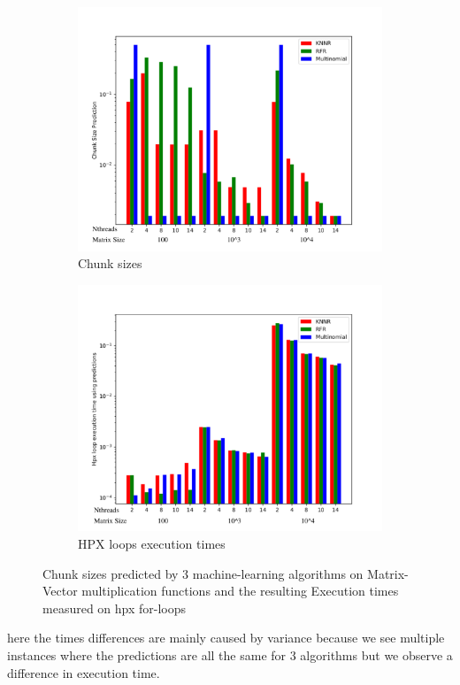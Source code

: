 \begin{figure}[h]
	\centering
	\begin{subfigure}[b]{0.5\textwidth}
		\centering
		\includegraphics[width=\textwidth]{images/bars_Vector_cs.pdf}
		\caption[Network2]%
		{{Chunk sizes}}    
	\end{subfigure}
	\hfill
	\begin{subfigure}[b]{0.49\textwidth}  
		\centering 
		\includegraphics[width=\textwidth]{images/bars_vector_times.pdf}
		\caption[]%
		{{HPX loops execution times}}    
	\end{subfigure}
	\caption{Chunk sizes predicted by 3 machine-learning algorithms on Matrix-Vector multiplication functions and the resulting Execution times measured on hpx for-loops} 
\end{figure}
here the times differences are mainly caused by variance because we see multiple instances where the predictions are all the same for 3 algorithms but we observe a difference in execution time.


